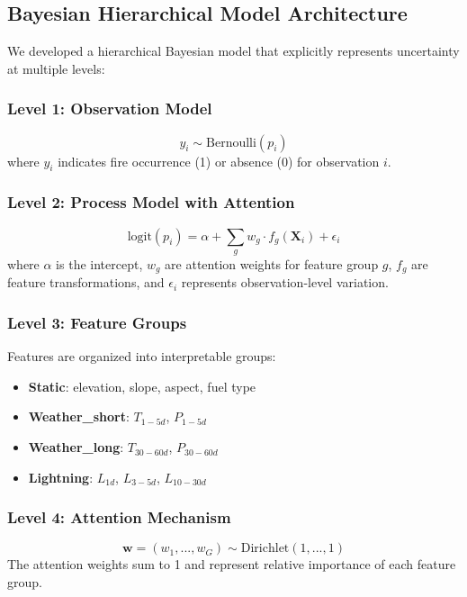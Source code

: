 \documentclass[11pt,a4paper]{article}
\begin{document}
\subsection{Bayesian Hierarchical Model Architecture}

We developed a hierarchical Bayesian model that explicitly represents uncertainty at multiple levels:

\subsubsection{Level 1: Observation Model}
\begin{equation}
y_i \sim \text{Bernoulli}(p_i)
\end{equation}
where $y_i$ indicates fire occurrence (1) or absence (0) for observation $i$.

\subsubsection{Level 2: Process Model with Attention}
\begin{equation}
\text{logit}(p_i) = \alpha + \sum_{g} w_g \cdot f_g(\mathbf{X}_i) + \epsilon_i
\end{equation}
where $\alpha$ is the intercept, $w_g$ are attention weights for feature group $g$, $f_g$ are feature transformations, and $\epsilon_i$ represents observation-level variation.

\subsubsection{Level 3: Feature Groups}
Features are organized into interpretable groups:
\begin{itemize}
    \item \textbf{Static}: elevation, slope, aspect, fuel type
    \item \textbf{Weather\_short}: $T_{1-5d}$, $P_{1-5d}$
    \item \textbf{Weather\_long}: $T_{30-60d}$, $P_{30-60d}$
    \item \textbf{Lightning}: $L_{1d}$, $L_{3-5d}$, $L_{10-30d}$
\end{itemize}

\subsubsection{Level 4: Attention Mechanism}
\begin{equation}
\mathbf{w} = (w_1, ..., w_G) \sim \text{Dirichlet}(1, ..., 1)
\end{equation}
The attention weights sum to 1 and represent relative importance of each feature group.
\end{document}
